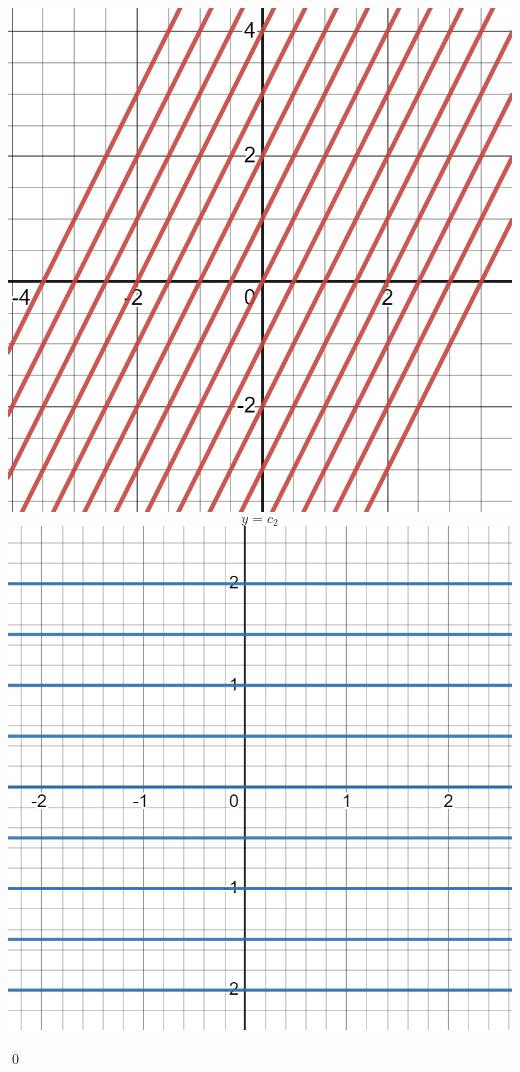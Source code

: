 \begin{homeworkProblem}
\begin{itemize}
\begin{solucion}
                 \includegraphics[scale=0.15]{desmos-graph.png}\\
                 $$y=c_2$$
             \centering
                 \includegraphics[scale=0.15]{desmos-graph (1).png}
                
           
              
               
            \qed
        \end{solucion}
    \end{itemize}
\end{homeworkProblem}

